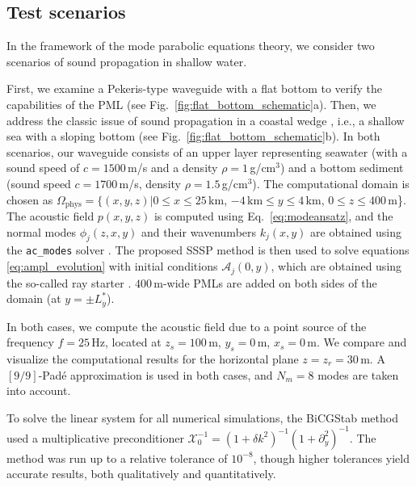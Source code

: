 \documentclass[11pt,a4paper]{article}
\newcommand{\cX}{\mathcal{X}}
\theoremstyle{plain}%
\theoremstyle{definition}
\theoremstyle{remark}
\begin{document}
\subsection{Test scenarios}

In the framework of the mode parabolic equations theory, we consider two scenarios of sound propagation in shallow water.

First, we examine a Pekeris-type waveguide with a flat bottom to verify the capabilities of the PML (see Fig.~\ref{fig:flat_bottom_schematic}a).
Then, we address the classic issue of sound propagation in a coastal wedge \cite{jensen2011computational}, i.e., a shallow sea with a sloping bottom (see Fig.~\ref{fig:flat_bottom_schematic}b). 
In both scenarios, our waveguide consists of an upper layer representing seawater (with a sound speed of $c=1500$\,m/s and a density $\rho=1$\,g/cm$^3$) and a bottom sediment (sound speed $c=1700$\,m/s, density $\rho=1.5$\,g/cm$^3$).
%
The computational domain is chosen as $\Omega_{\mathrm{phys}} = \{(x,y,z)|0 \le x \le 25\,\mathrm{km}$, $-4\,\mathrm{km} \le y \le 4\,\mathrm{km}$, $0 \le z\le400\,\mathrm{m}$\}. 
The acoustic field $p(x,y,z)$ is computed using Eq.~\eqref{eq:modeansatz}, and the normal modes $\phi_j(z,x,y)$ and their wavenumbers $k_j(x,y)$ are obtained using the \texttt{ac\_modes} solver \cite{PETROV2020115526}. 
The proposed SSSP method is then used to solve equations \eqref{eq:ampl_evolution} with initial conditions $\mathcal{A}_j(0,y)$, which are obtained using the so-called ray starter \cite{PETROV2020115526}. $400$\,m-wide PMLs are added on both sides of the domain (at $y=\pm L^*_y$).

In both cases, we compute the acoustic field due to a point source of the frequency $f=25$\,Hz, located at $z_s=100$\,m, $y_s=0$\,m, $x_s=0$\,m. 
We compare and visualize the computational results for the horizontal plane $z=z_r=30$\,m. 
A $[9/9]$-Pad\'e  approximation is used in both cases, and  $N_m = 8$ modes are taken into account.

To solve the linear system for all numerical simulations, the BiCGStab method used a multiplicative preconditioner $\cX_0^{-1} = (1 + \delta k^2)^{-1}(1 + \partial_y^2)^{-1}$.
The method was run up to a relative tolerance of $10^{-8}$, though higher tolerances yield accurate results, both qualitatively and quantitatively. 
%
\end{document}
